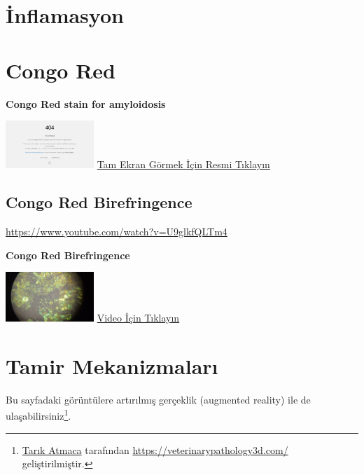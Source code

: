\documentclass[
  letterpaper,
  paper=6in:9in,
  pagesize=pdftex,
  headinclude=on,
  footinclude=on,
  12pt]{scrbook}
\begin{document}
\hypertarget{sec-inflamasyon}{%
\chapter{İnflamasyon}\label{sec-inflamasyon}}

\hypertarget{sec-amiloidoz-congo-red}{%
\chapter{Congo Red}\label{sec-amiloidoz-congo-red}}

\textbf{Congo Red stain for amyloidosis}

\href{https://images.patolojiatlasi.com/congored/congored.html}{\includegraphics[width=0.25\textwidth,height=\textheight]{./screenshots/congored_screenshot.png}}
\href{https://images.patolojiatlasi.com/congored/congored.html}{Tam
Ekran Görmek İçin Resmi Tıklayın}

\hypertarget{sec-amiloidoz-congo-red-birefringence}{%
\section{Congo Red
Birefringence}\label{sec-amiloidoz-congo-red-birefringence}}

\url{https://www.youtube.com/watch?v=U9glkfQLTm4}

\textbf{Congo Red Birefringence}

\href{https://www.youtube.com/watch?v=U9glkfQLTm4}{\includegraphics[width=0.25\textwidth,height=\textheight]{./screenshots/congoredvideo_screenshot.png}}
\href{https://www.youtube.com/watch?v=U9glkfQLTm4}{Video İçin Tıklayın}

\hypertarget{sec-tamir-mekanizmalari}{%
\chapter{Tamir Mekanizmaları}\label{sec-tamir-mekanizmalari}}

Bu sayfadaki görüntülere artırılmış gerçeklik (augmented reality) ile de
ulaşabilirsiniz\footnote{\href{https://github.com/veterinarypathology3d}{Tarık
  Atmaca} tarafından \url{https://veterinarypathology3d.com/}
  geliştirilmiştir.}.
\end{document}
